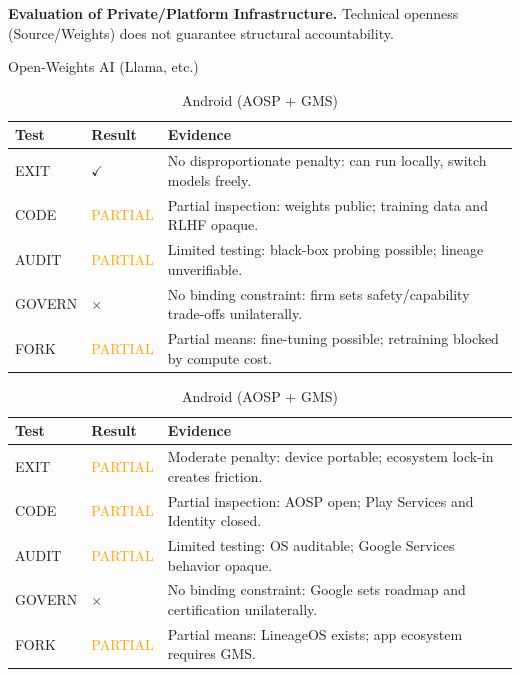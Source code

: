 \documentclass{article}
\begin{document}
\begin{table}[htbp]
    \centering
    \caption{\textbf{Evaluation of Private/Platform Infrastructure.} Technical openness (Source/Weights) does not guarantee structural accountability.}
    \label{tab:corp_infra}

    \begin{subtable}{1\textwidth}
        \centering
        \caption{Open-Weights AI (Llama, etc.)}
        \small
        \begin{tabular}{@{}llp{8.5cm}@{}}
            \toprule
            \textbf{Test} & \textbf{Result} & \textbf{Evidence} \\
            \midrule
            EXIT & $\checkmark$ & No disproportionate penalty: can run locally, switch models freely. \\
            CODE & \textcolor{orange}{PARTIAL} & Partial inspection: weights public; training data and RLHF opaque. \\
            AUDIT & \textcolor{orange}{PARTIAL} & Limited testing: black-box probing possible; lineage unverifiable. \\
            GOVERN & $\times$ & No binding constraint: firm sets safety/capability trade-offs unilaterally. \\
            FORK & \textcolor{orange}{PARTIAL} & Partial means: fine-tuning possible; retraining blocked by compute cost. \\
            \bottomrule
        \end{tabular}
        \vspace{0.3cm}
    \end{subtable}

    \begin{subtable}{1\textwidth}
        \centering
        \caption{Android (AOSP + GMS)}
        \small
        \begin{tabular}{@{}llp{8.5cm}@{}}
            \toprule
            \textbf{Test} & \textbf{Result} & \textbf{Evidence} \\
            \midrule
            EXIT & \textcolor{orange}{PARTIAL} & Moderate penalty: device portable; ecosystem lock-in creates friction. \\
            CODE & \textcolor{orange}{PARTIAL} & Partial inspection: AOSP open; Play Services and Identity closed. \\
            AUDIT & \textcolor{orange}{PARTIAL} & Limited testing: OS auditable; Google Services behavior opaque. \\
            GOVERN & $\times$ & No binding constraint: Google sets roadmap and certification unilaterally. \\
            FORK & \textcolor{orange}{PARTIAL} & Partial means: LineageOS exists; app ecosystem requires GMS. \\
            \bottomrule
        \end{tabular}
        \vspace{0.3cm}
    \end{subtable}


\end{table}
\end{document}
